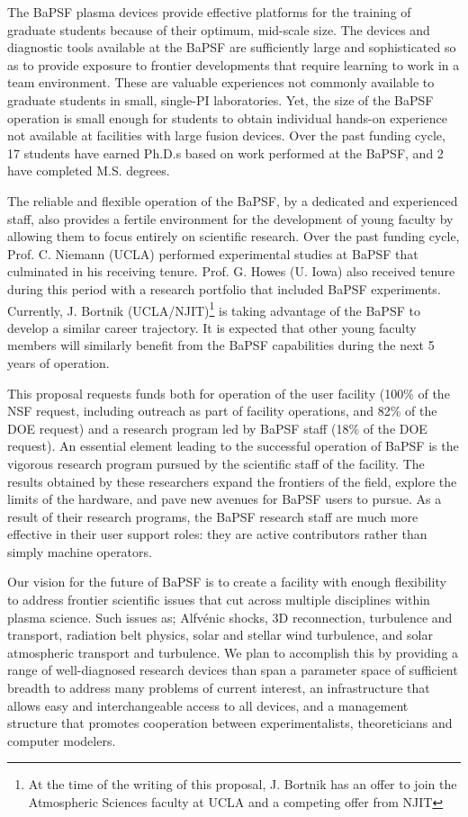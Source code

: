 \documentclass[11pt]{article}
\begin{document}
The BaPSF plasma devices provide effective platforms for the training
of graduate students because of their optimum, mid-scale size. The
devices and diagnostic tools available at the BaPSF are sufficiently
large and sophisticated so as to provide exposure to frontier
developments that require learning to work in a team
environment. These are valuable experiences not commonly available to
graduate students in small, single-PI laboratories. Yet, the size of
the BaPSF operation is small enough for students to obtain individual
hands-on experience not available at facilities with large fusion
devices. Over the past funding cycle, 17 students have earned Ph.D.s
based on work performed at the BaPSF, and 2 have completed
M.S. degrees.

The reliable and flexible operation of the BaPSF, by a dedicated and
experienced staff, also provides a fertile environment for the
development of young faculty by allowing them to focus entirely on
scientific research. Over the past funding cycle, Prof. C. Niemann
(UCLA) performed experimental studies at BaPSF that culminated in his
receiving tenure. Prof. G. Howes (U. Iowa) also received tenure during
this period with a research portfolio that included BaPSF experiments.
Currently, J. Bortnik (UCLA/NJIT)\footnote{At the time of the writing
  of this proposal, J. Bortnik has an offer to join the Atmospheric
  Sciences faculty at UCLA and a competing offer from NJIT} is taking advantage of the BaPSF to develop
a similar career trajectory. It is expected that other young faculty
members will similarly benefit from the BaPSF capabilities during the
next 5 years of operation.

This proposal requests funds both for operation of the user facility
(100\% of the NSF request, including outreach as part of facility
operations, and 82\% of the DOE request) and a research program led by
BaPSF staff (18\% of the DOE request).  An essential element leading
to the successful operation of BaPSF is the vigorous research program
pursued by the scientific staff of the facility. The results obtained
by these researchers expand the frontiers of the field, explore the
limits of the hardware, and pave new avenues for BaPSF users to
pursue. As a result of their research programs, the BaPSF research
staff are much more effective in their user support roles: they are
active contributors rather than simply machine operators.

Our vision for the future of BaPSF is to create a facility with enough
flexibility to address frontier scientific issues that cut across
multiple disciplines within plasma science. Such issues as; Alfvénic
shocks, 3D reconnection, turbulence and transport, radiation belt
physics, solar and stellar wind turbulence, and solar atmospheric
transport and turbulence. We plan to accomplish this by providing a
range of well-diagnosed research devices than span a parameter space
of sufficient breadth to address many problems of current interest, an
infrastructure that allows easy and interchangeable access to all
devices, and a management structure that promotes cooperation between
experimentalists, theoreticians and computer modelers.
\end{document}
